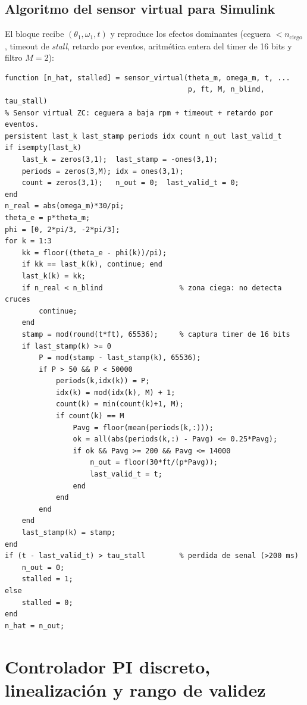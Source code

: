 \documentclass[11pt,a4paper,oneside]{report}
\theoremstyle{definition}
\theoremstyle{remark}
\begin{document}
\section{Algoritmo del sensor virtual para Simulink}\label{sec:sensor_virtual}
El bloque recibe $(\theta_1, \omega_1, t)$ y reproduce los efectos dominantes
(ceguera $< n_{\text{ciego}}$, timeout de \emph{stall}, retardo por eventos,
aritmética entera del timer de 16 bits y filtro $M=2$):
\begin{small}
\begin{verbatim}
function [n_hat, stalled] = sensor_virtual(theta_m, omega_m, t, ...
                                           p, ft, M, n_blind, tau_stall)
% Sensor virtual ZC: ceguera a baja rpm + timeout + retardo por eventos.
persistent last_k last_stamp periods idx count n_out last_valid_t
if isempty(last_k)
    last_k = zeros(3,1);  last_stamp = -ones(3,1);
    periods = zeros(3,M); idx = ones(3,1);
    count = zeros(3,1);   n_out = 0;  last_valid_t = 0;
end
n_real = abs(omega_m)*30/pi;
theta_e = p*theta_m;
phi = [0, 2*pi/3, -2*pi/3];
for k = 1:3
    kk = floor((theta_e - phi(k))/pi);
    if kk == last_k(k), continue; end
    last_k(k) = kk;
    if n_real < n_blind                  % zona ciega: no detecta cruces
        continue;
    end
    stamp = mod(round(t*ft), 65536);     % captura timer de 16 bits
    if last_stamp(k) >= 0
        P = mod(stamp - last_stamp(k), 65536);
        if P > 50 && P < 50000
            periods(k,idx(k)) = P;
            idx(k) = mod(idx(k), M) + 1;
            count(k) = min(count(k)+1, M);
            if count(k) == M
                Pavg = floor(mean(periods(k,:)));
                ok = all(abs(periods(k,:) - Pavg) <= 0.25*Pavg);
                if ok && Pavg >= 200 && Pavg <= 14000
                    n_out = floor(30*ft/(p*Pavg));
                    last_valid_t = t;
                end
            end
        end
    end
    last_stamp(k) = stamp;
end
if (t - last_valid_t) > tau_stall        % perdida de senal (>200 ms)
    n_out = 0;
    stalled = 1;
else
    stalled = 0;
end
n_hat = n_out;
\end{verbatim}
\end{small}

\chapter{Controlador PI discreto, linealización y rango de validez}\label{cap:pi_lin}
\end{document}
